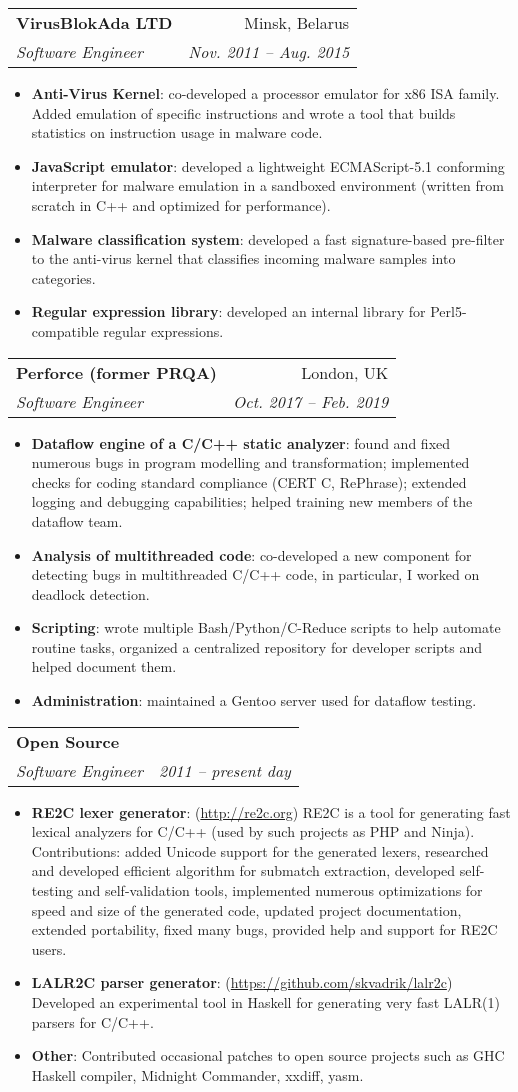 \documentclass[letterpaper,11pt]{article}
\makeatletter
\newcommand{\resumeItem}[2]{
  \item\small{
    \textbf{#1}{: #2 \vspace{-2pt}}
  }
}
\newcommand{\resumeSubheading}[4]{
  \vspace{-1pt}\item[]
    \begin{tabular*}{0.97\textwidth}{l@{\extracolsep{\fill}}r}
      \textbf{#1} & #2 \\
      \textit{\small#3} & \textit{\small #4} \\
    \end{tabular*}\vspace{-5pt}
}
\newcommand{\resumeItemListStart}{\begin{itemize}}
\newcommand{\resumeItemListEnd}{\end{itemize}\vspace{-5pt}}
\makeatother
\begin{document}
    \resumeSubheading
      {VirusBlokAda LTD}{Minsk, Belarus}
      {Software Engineer}{Nov. 2011 -- Aug. 2015}
      \resumeItemListStart
        \resumeItem{Anti-Virus Kernel}
          {co-developed a processor emulator for x86 ISA family.
          Added emulation of specific instructions
          and wrote a tool that builds statistics on instruction usage in malware code.}
        \resumeItem{JavaScript emulator}
          {developed a lightweight ECMAScript-5.1 conforming interpreter for malware emulation in a sandboxed environment
          (written from scratch in C++ and optimized for performance).}
        \resumeItem{Malware classification system}
          {developed a fast signature-based pre-filter to the anti-virus kernel
          that classifies incoming malware samples into categories.}
        \resumeItem{Regular expression library}
          {developed an internal library for Perl5-compatible regular expressions.}
      \resumeItemListEnd

    \resumeSubheading
      {Perforce (former PRQA)}{London, UK}
      {Software Engineer}{Oct. 2017 -- Feb. 2019}
      \resumeItemListStart
        \resumeItem{Dataflow engine of a C/C++ static analyzer}
          {found and fixed numerous bugs in program modelling and transformation;
          implemented checks for coding standard compliance (CERT C, RePhrase);
          extended logging and debugging capabilities;
          helped training new members of the dataflow team.}
        \resumeItem{Analysis of multithreaded code}
          {co-developed a new component for detecting bugs in multithreaded C/C++ code,
          in particular, I worked on deadlock detection.}
        \resumeItem{Scripting}
          {wrote multiple Bash/Python/C-Reduce scripts to help automate routine tasks,
          organized a centralized repository for developer scripts and helped document them.}
        \resumeItem{Administration}
          {maintained a Gentoo server used for dataflow testing.}
      \resumeItemListEnd

    \resumeSubheading
      {Open Source}{}
      {Software Engineer}{2011 -- present day}
      \resumeItemListStart
        \resumeItem{RE2C lexer generator}
          {(\url{http://re2c.org})
          RE2C is a tool for generating fast lexical analyzers for C/C++
          (used by such projects as PHP and Ninja).
          Contributions:
          added Unicode support for the generated lexers,
          researched and developed efficient algorithm for submatch extraction,
          developed self-testing and self-validation tools,
          implemented numerous optimizations for speed and size of the generated code,
          updated project documentation,
          extended portability,
          fixed many bugs,
          provided help and support for RE2C users.
          }
        \resumeItem{LALR2C parser generator}
          {(\url{https://github.com/skvadrik/lalr2c})
          Developed an experimental tool in Haskell for generating very fast LALR(1) parsers for C/C++.}
        \resumeItem{Other}
          {Contributed occasional patches to open source projects such as GHC Haskell compiler, Midnight Commander, xxdiff, yasm.}
      \resumeItemListEnd
\end{document}
